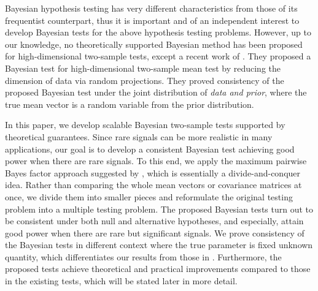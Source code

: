 \documentclass[11pt]{article}
\begin{document}
Bayesian hypothesis testing has very different characteristics from those of its frequentist counterpart,  thus it is important and of an independent interest to develop Bayesian tests for the above hypothesis testing problems. However, up to our knowledge, no theoretically supported Bayesian method has been proposed for high-dimensional two-sample tests, except a recent work of \cite{zoh2018powerful}.
They proposed a Bayesian test for high-dimensional two-sample mean test by reducing the dimension of data via random projections.
They proved  consistency of the proposed Bayesian test under the joint distribution of {\it data and prior}, where the true mean vector is a random variable from the prior distribution.


In this paper, we develop scalable Bayesian two-sample tests supported by theoretical guarantees. 
Since rare signals can be more realistic in many applications, our goal is to develop a consistent Bayesian test achieving good power when there are rare signals.
To this end, we apply the maximum pairwise Bayes factor approach suggested by \cite{lee2018maximum}, which is essentially a divide-and-conquer idea.
Rather than comparing the whole mean vectors or covariance matrices at once, we divide them into smaller pieces and reformulate the original testing problem into a multiple testing problem. 
The proposed Bayesian tests turn out to be consistent under both null and alternative hypotheses, and especially, attain good power when there are rare but significant signals.
We prove consistency of the Bayesian tests in different context where the true parameter is fixed unknown quantity, which differentiates our results from those in \cite{zoh2018powerful}.
Furthermore, the proposed tests achieve theoretical and practical improvements compared to those in the existing tests, which will be stated later in more detail.
\end{document}
